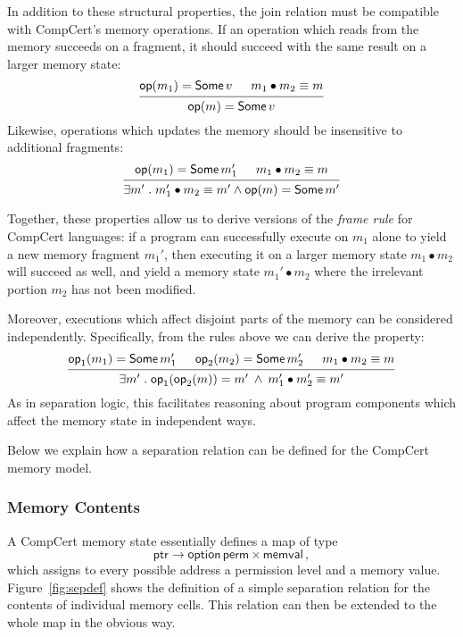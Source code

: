 \documentclass[acmsmall,screen,review,anonymous]{acmart}
\newcommand{\kw}[1]{\ensuremath{ \mathsf{#1} }}
\begin{document}
In addition to these structural properties,
the join relation must be compatible
with CompCert's memory operations.
If an operation which reads from the memory succeeds on a fragment,
it should succeed with the same result on a larger memory state:
\[
  \begin{prooftree}
    \hypo{\kw{op}(m_1) = \kw{Some}\,v}
    \hypo{m_1 \bullet m_2 \equiv m}
    \infer2{\kw{op}(m) = \kw{Some}\,v}
  \end{prooftree}
\]
Likewise,
operations which updates the memory
should be insensitive to additional fragments:
\[
  \begin{prooftree}
    \hypo{\kw{op}(m_1) = \kw{Some}\,m_1'}
    \hypo{m_1 \bullet m_2 \equiv m}
    \infer2{\exists m' \mathrel.
      m_1' \bullet m_2 \equiv m' \wedge
      \kw{op}(m) = \kw{Some}\,m'}
  \end{prooftree}
\]

Together,
these properties allow us to derive
versions of the \emph{frame rule}
for CompCert languages:
if a program can successfully execute on $m_1$ alone
to yield a new memory fragment $m_1'$,
then executing it on a larger memory state
$m_1 \bullet m_2$ will succeed as well,
and yield a memory state $m_1' \bullet m_2$
where the irrelevant portion $m_2$
has not been modified.

Moreover,
executions which affect disjoint parts of the memory
can be considered independently.
Specifically, from the rules above
we can derive the property:
\[
  \begin{prooftree}
    \hypo{\kw{op}_1(m_1) = \kw{Some}\,m_1'}
    \hypo{\kw{op}_2(m_2) = \kw{Some}\,m_2'}
    \hypo{m_1 \bullet m_2 \equiv m}
    \infer3{\exists m' \mathrel.
      \kw{op}_1(\kw{op}_2(m)) =
	m' \:\wedge\:
      m_1' \bullet m_2' \equiv m'}
  \end{prooftree}
\]
As in separation logic,
this facilitates reasoning
about program components
which affect the memory state in independent ways.

Below we explain how a separation relation can be defined
for the CompCert memory model.

\subsubsection{Memory Contents}

A CompCert memory state essentially defines a map of type
\[
  \kw{ptr} \rightarrow \kw{option}\,\kw{perm} \times \kw{memval} \,,
\]
which assigns to every possible address
a permission level and a memory value.
Figure~\ref{fig:sepdef}
shows the definition of a simple separation relation
for the contents of individual memory cells.
This relation can then be extended to the whole map
in the obvious way.
\end{document}
